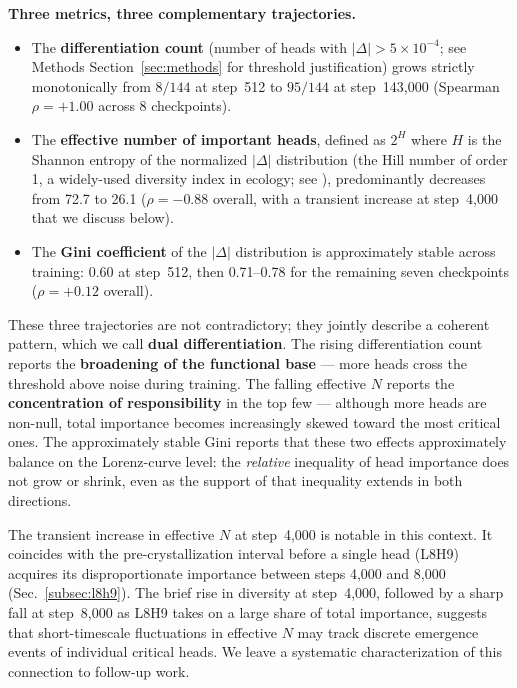 \documentclass{article}
\begin{document}
\textbf{Three metrics, three complementary trajectories.}

\begin{itemize}
    \item The \textbf{differentiation count} (number of heads with $|\Delta| > 5 \times 10^{-4}$; see Methods Section~\ref{sec:methods} for threshold justification) grows strictly monotonically from $8/144$ at step~512 to $95/144$ at step~143,000 (Spearman $\rho = +1.00$ across 8 checkpoints).
    \item The \textbf{effective number of important heads}, defined as $2^H$ where $H$ is the Shannon entropy of the normalized $|\Delta|$ distribution (the Hill number of order 1, a widely-used diversity index in ecology; see \citealp{hill1973diversity, jost2006entropy}), predominantly decreases from 72.7 to 26.1 ($\rho = -0.88$ overall, with a transient increase at step~4,000 that we discuss below).
    \item The \textbf{Gini coefficient} of the $|\Delta|$ distribution is approximately stable across training: 0.60 at step~512, then 0.71--0.78 for the remaining seven checkpoints ($\rho = +0.12$ overall).
\end{itemize}

These three trajectories are not contradictory; they jointly describe a coherent pattern, which we call \textbf{dual differentiation}. The rising differentiation count reports the \textbf{broadening of the functional base} --- more heads cross the threshold above noise during training. The falling effective $N$ reports the \textbf{concentration of responsibility} in the top few --- although more heads are non-null, total importance becomes increasingly skewed toward the most critical ones. The approximately stable Gini reports that these two effects approximately balance on the Lorenz-curve level: the \emph{relative} inequality of head importance does not grow or shrink, even as the support of that inequality extends in both directions.

The transient increase in effective $N$ at step~4,000 is notable in this context. It coincides with the pre-crystallization interval before a single head (L8H9) acquires its disproportionate importance between steps 4,000 and 8,000 (Sec.~\ref{subsec:l8h9}). The brief rise in diversity at step~4,000, followed by a sharp fall at step~8,000 as L8H9 takes on a large share of total importance, suggests that short-timescale fluctuations in effective $N$ may track discrete emergence events of individual critical heads. We leave a systematic characterization of this connection to follow-up work.
\end{document}
